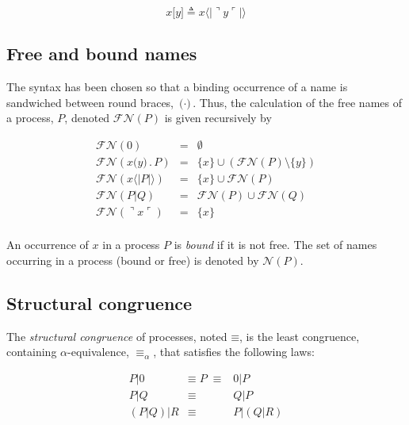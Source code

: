 \documentclass[]{amsart}
\newcommand{\lliftb}{\langle\!|}
\newcommand{\rliftb}{|\!\rangle}
\newcommand{\lpquote}{\ulcorner}
\newcommand{\rpquote}{\urcorner}
\newcommand{\id}[1]{\texttt{#1}}
\newcommand{\pzero}{\mathbin{0}}
\newcommand{\juxtap}{\mathbin{\id{|}}}
\newcommand{\concat}{\mathbin{.}}
\newcommand{\scong}{\mathbin{\equiv}}
\newcommand{\alphaeq}{\mathbin{\equiv_{\alpha}}}
\newcommand{\names}[1]{\mathbin{\mathcal{N}(#1)}}
\newcommand{\freenames}[1]{\mathbin{\mathcal{FN}(#1)}}
\newcommand{\binpar}[2]{#1 \juxtap #2}
\newcommand{\lift}[2]{#1 \lliftb #2 \rliftb}
\newcommand{\dropn}[1]{\rpquote #1 \lpquote}
\theoremstyle{definition}
\theoremstyle{remark}
\numberwithin{equation}{subsection}
\begin{document}
\begin{equation*}
	{x}\id{[}{y}\id{]} \triangleq \lift{x}{\dropn{y}}
\end{equation*}

\subsection{Free and bound names}

The syntax has been chosen so that a binding occurrence of a name is
sandwiched between round braces, $\id{(} \cdot \id{)}$. Thus, the
calculation of the free names of a process, $P$, denoted
$\freenames{P}$ is given recursively by

	\begin{eqnarray*}
		\freenames{\pzero} & = & \emptyset \\
		\freenames{x \id{(}y\id{)} \concat P} & = & \{ x \} \cup (\freenames{P} \setminus \{ y \}) \\
		\freenames{\lift{x}{P}} & = & \{ x \} \cup \freenames{P} \\
		\freenames{\binpar{P}{Q}} & = & \freenames{P} \cup \freenames{Q} \\
		\freenames{\dropn{x}} & = & \{ x \} \\
	\end{eqnarray*}

An occurrence of $x$ in a process $P$ is \textit{bound} if it is not
free. The set of names occurring in a process (bound or free) is
denoted by $\names{P}$.

\subsection{Structural congruence}

The {\em structural congruence} of processes, noted $\scong$, is the
least congruence, containing $\alpha$-equivalence, $\alphaeq$, that
satisfies the following laws:

\begin{eqnarray*}
	{P} \juxtap \pzero	
		&  \scong \; {P} \; \scong & 
			\pzero \juxtap {P} \\
	{P} \juxtap {Q}	
		& \scong & 
			{Q} \juxtap {P} \\
	({P} \juxtap {Q}) \juxtap {R}
		& \scong & 
			{P} \juxtap ({Q} \juxtap {R}) \\
\end{eqnarray*}
\end{document}
